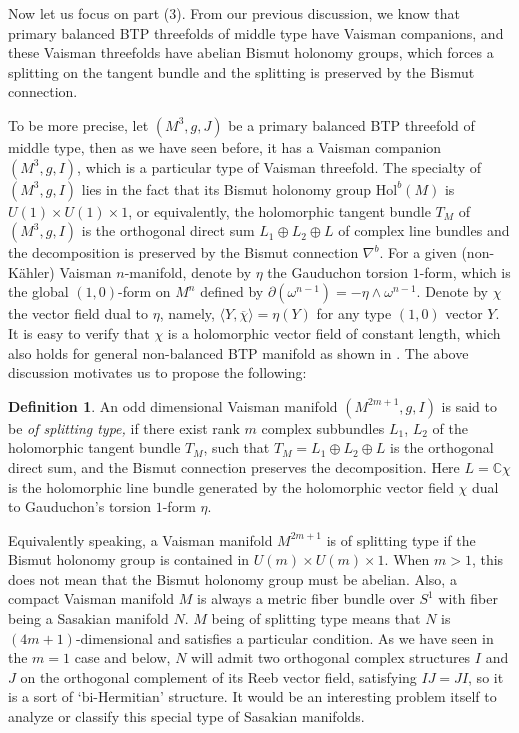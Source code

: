 \documentclass{amsart}
\numberwithin{equation}{section}
\theoremstyle{definition}
\newtheorem{definition}  [theorem]     {Definition}
\renewcommand{\1}{\mathds{1}}
\renewcommand{\>}{\rightarrow}
\begin{document}
Now let us focus on part (3). From our previous discussion, we know that primary balanced BTP threefolds of middle type have Vaisman companions, and these Vaisman threefolds have abelian Bismut holonomy groups, which forces a splitting on the tangent bundle and the splitting is preserved by the Bismut connection.

To be more precise, let  $(M^3,g,J)$ be a primary balanced BTP threefold of middle type, then as we have seen before, it has a  Vaisman companion $(M^3,g,I)$, which is a particular type of Vaisman threefold. The specialty of $(M^3,g,I)$ lies in the fact that its Bismut holonomy group $\mbox{Hol}^b(M)$ is $U(1)\!\times\!U(1)\!\times\!1$, or equivalently, the holomorphic tangent bundle $T_M$ of $(M^3,g,I)$ is the orthogonal direct sum $L_1\oplus L_2\oplus L$ of complex line bundles and the decomposition is preserved by the Bismut connection $\nabla^b$. For a given (non-K\"ahler) Vaisman $n$-manifold, denote by $\eta$ the Gauduchon torsion $1$-form, which is the global $(1,0)$-form on $M^n$ defined by $\partial (\omega^{n-1}) = -\eta \wedge \omega^{n-1}$. Denote by $\chi$ the vector field dual to $\eta$, namely, $\langle Y, \overline{\chi}\rangle =\eta(Y)$ for any type $(1,0)$ vector $Y$. It is easy to verify that $\chi$ is a holomorphic vector field of constant length, which also holds for general non-balanced BTP manifold as shown in \cite[Proposition 1.7]{ZhaoZ24}. The above discussion motivates us to propose the following:

\begin{definition}
An odd dimensional Vaisman manifold $(M^{2m+1},g,I)$ is said to be {\em of splitting type,} if there exist rank $m$ complex subbundles $L_1$, $L_2$ of the holomorphic tangent bundle $T_M$, such that $T_M=L_1\oplus L_2\oplus L$ is the orthogonal direct sum, and the Bismut connection preserves the decomposition. Here $L={\mathbb C}\chi $ is the holomorphic line bundle generated by the holomorphic vector field $\chi$ dual to Gauduchon's torsion $1$-form $\eta$.
\end{definition}

Equivalently speaking, a Vaisman manifold $M^{2m+1}$ is of splitting type if the Bismut holonomy group is contained in $U(m)\!\times\!U(m)\!\times\!1$. When $m>1$, this does not mean that the Bismut holonomy group must be abelian. Also, a compact Vaisman manifold $M$ is always a metric fiber bundle over $S^1$ with fiber being a Sasakian manifold $N$. $M$ being of splitting type means that $N$ is $(4m+1)$-dimensional and satisfies a particular condition. As we have seen in the $m=1$ case and below, $N$ will admit two orthogonal complex structures $I$ and $J$ on the orthogonal complement of its Reeb vector field, satisfying $IJ=JI$, so it is a sort  of `bi-Hermitian' structure. It would be an interesting problem itself to analyze or classify this special type of Sasakian manifolds.
\end{document}
